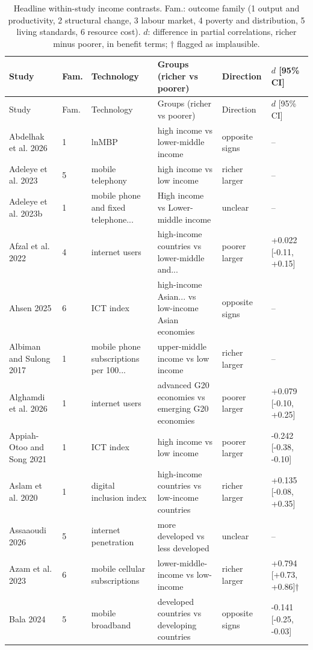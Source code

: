 {\scriptsize\setlength{\tabcolsep}{3pt}\begin{longtable}{@{}p{3.0cm} p{0.4cm} p{3.3cm} p{3.7cm} p{1.8cm} p{2.9cm}@{}}
\caption{Headline within-study income contrasts. Fam.: outcome family (1 output and productivity, 2 structural change, 3 labour market, 4 poverty and distribution, 5 living standards, 6 resource cost). $d$: difference in partial correlations, richer minus poorer, in benefit terms; $\dagger$ flagged as implausible.}\label{tab:capp}\\
\toprule Study & Fam. & Technology & Groups (richer vs poorer) & Direction & $d$ [95\% CI]\\\midrule\endfirsthead
\toprule Study & Fam. & Technology & Groups (richer vs poorer) & Direction & $d$ [95\% CI]\\\midrule\endhead
\bottomrule\endfoot
Abdelhak et al. 2026 & 1 & lnMBP & high income vs lower-middle income & opposite signs & --\\
Adeleye et al. 2023 & 5 & mobile telephony & high income vs low income & richer larger & --\\
Adeleye et al. 2023b & 1 & mobile phone and fixed telephone... & High income vs Lower-middle income & unclear & --\\
Afzal et al. 2022 & 4 & internet users & high-income countries vs lower-middle and... & poorer larger & +0.022 [-0.11, +0.15]\\
Ahsen 2025 & 6 & ICT index & high-income Asian... vs low-income Asian economies & opposite signs & --\\
Albiman and Sulong 2017 & 1 & mobile phone subscriptions per 100... & upper-middle income vs low income & richer larger & --\\
Alghamdi et al. 2026 & 1 & internet users & advanced G20 economies vs emerging G20 economies & poorer larger & +0.079 [-0.10, +0.25]\\
Appiah-Otoo and Song 2021 & 1 & ICT index & high income vs low income & poorer larger & -0.242 [-0.38, -0.10]\\
Aslam et al. 2020 & 1 & digital inclusion index & high-income countries vs low-income countries & richer larger & +0.135 [-0.08, +0.35]\\
Assaaoudi 2026 & 5 & internet penetration & more developed vs less developed & unclear & --\\
Azam et al. 2023 & 6 & mobile cellular subscriptions & lower-middle-income vs low-income & richer larger & +0.794 [+0.73, +0.86]$\dagger$\\
Bala 2024 & 5 & mobile broadband & developed countries vs developing countries & opposite signs & -0.141 [-0.25, -0.03]\\

\end{longtable}}
